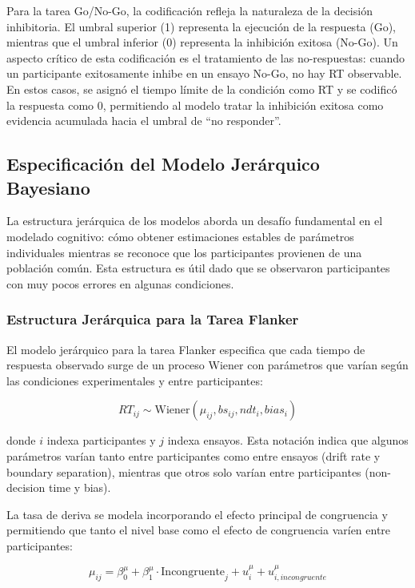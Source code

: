 \documentclass[
  spanish,
  10pt,
]{article}
\begin{document}
Para la tarea Go/No-Go, la codificación refleja la naturaleza de la
decisión inhibitoria. El umbral superior (1) representa la ejecución de
la respuesta (Go), mientras que el umbral inferior (0) representa la
inhibición exitosa (No-Go). Un aspecto crítico de esta codificación es
el tratamiento de las no-respuestas: cuando un participante exitosamente
inhibe en un ensayo No-Go, no hay RT observable. En estos casos, se
asignó el tiempo límite de la condición como RT y se codificó la
respuesta como 0, permitiendo al modelo tratar la inhibición exitosa
como evidencia acumulada hacia el umbral de ``no responder''.

\subsection{Especificación del Modelo Jerárquico
Bayesiano}\label{especificaciuxf3n-del-modelo-jeruxe1rquico-bayesiano}

La estructura jerárquica de los modelos aborda un desafío fundamental en
el modelado cognitivo: cómo obtener estimaciones estables de parámetros
individuales mientras se reconoce que los participantes provienen de una
población común. Esta estructura es útil dado que se observaron
participantes con muy pocos errores en algunas condiciones.

\subsubsection{Estructura Jerárquica para la Tarea
Flanker}\label{estructura-jeruxe1rquica-para-la-tarea-flanker}

El modelo jerárquico para la tarea Flanker especifica que cada tiempo de
respuesta observado surge de un proceso Wiener con parámetros que varían
según las condiciones experimentales y entre participantes:

\[RT_{ij} \sim \text{Wiener}(\mu_{ij}, bs_{ij}, ndt_i, bias_i)\]

donde \(i\) indexa participantes y \(j\) indexa ensayos. Esta notación
indica que algunos parámetros varían tanto entre participantes como
entre ensayos (drift rate y boundary separation), mientras que otros
solo varían entre participantes (non-decision time y bias).

La tasa de deriva se modela incorporando el efecto principal de
congruencia y permitiendo que tanto el nivel base como el efecto de
congruencia varíen entre participantes:

\[\mu_{ij} = \beta_0^{\mu} + \beta_1^{\mu} \cdot \text{Incongruente}_{j} + u_i^{\mu} + u_{i,incongruente}^{\mu}\]
\end{document}
